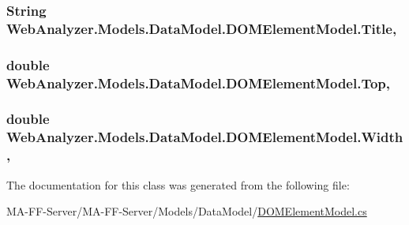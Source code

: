 \subsubsection[{Title}]{\setlength{\rightskip}{0pt plus 5cm}String Web\+Analyzer.\+Models.\+Data\+Model.\+D\+O\+M\+Element\+Model.\+Title\hspace{0.3cm}{\ttfamily [get]}, {\ttfamily [set]}}\label{class_web_analyzer_1_1_models_1_1_data_model_1_1_d_o_m_element_model_a10a1c3ec9fceca5b4745cae7f9647c74}
\hypertarget{class_web_analyzer_1_1_models_1_1_data_model_1_1_d_o_m_element_model_a1f17dcaf6e924292f3b6a8ade726941d}{}
\subsubsection[{Top}]{\setlength{\rightskip}{0pt plus 5cm}double Web\+Analyzer.\+Models.\+Data\+Model.\+D\+O\+M\+Element\+Model.\+Top\hspace{0.3cm}{\ttfamily [get]}, {\ttfamily [set]}}\label{class_web_analyzer_1_1_models_1_1_data_model_1_1_d_o_m_element_model_a1f17dcaf6e924292f3b6a8ade726941d}
\hypertarget{class_web_analyzer_1_1_models_1_1_data_model_1_1_d_o_m_element_model_a34aa9812237c151017294753a8ee77a7}{}
\subsubsection[{Width}]{\setlength{\rightskip}{0pt plus 5cm}double Web\+Analyzer.\+Models.\+Data\+Model.\+D\+O\+M\+Element\+Model.\+Width\hspace{0.3cm}{\ttfamily [get]}, {\ttfamily [set]}}\label{class_web_analyzer_1_1_models_1_1_data_model_1_1_d_o_m_element_model_a34aa9812237c151017294753a8ee77a7}


The documentation for this class was generated from the following file\+:\begin{DoxyCompactItemize}
\item 
M\+A-\/\+F\+F-\/\+Server/\+M\+A-\/\+F\+F-\/\+Server/\+Models/\+Data\+Model/\hyperlink{_d_o_m_element_model_8cs}{D\+O\+M\+Element\+Model.\+cs}\end{DoxyCompactItemize}
